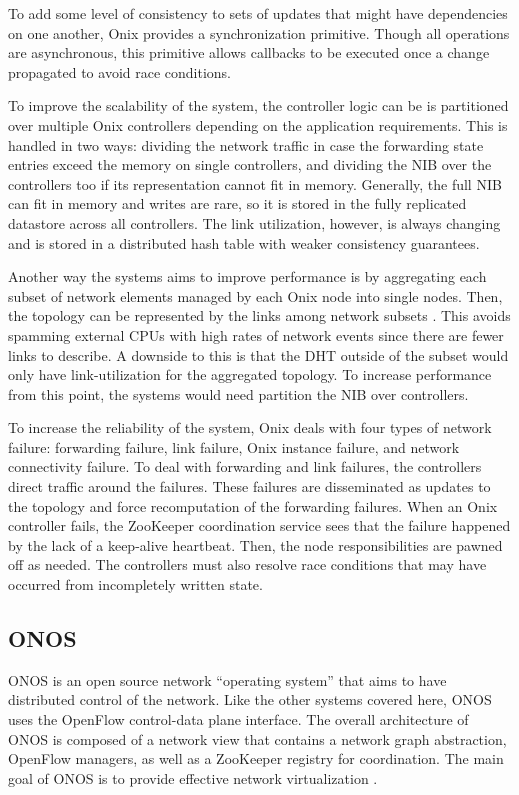 \documentclass[letterpaper,twocolumn,10pt]{article}
\begin{document}
To add some level of consistency to sets of updates that might have dependencies on one another, Onix provides a synchronization primitive. Though all operations are asynchronous, this primitive allows callbacks to be executed once a change propagated to avoid race conditions.

To improve the scalability of the system, the controller logic can be is partitioned over multiple Onix controllers depending on the application requirements. This is handled in two ways: dividing the network traffic in case the forwarding state entries exceed the memory on single controllers, and dividing the NIB over the controllers too if its representation cannot fit in memory. Generally, the full NIB can fit in memory and writes are rare, so it is stored in the fully replicated datastore across all controllers. The link utilization, however, is always changing and is stored in a distributed hash table with weaker consistency guarantees.

Another way the systems aims to improve performance is by aggregating each subset of network elements managed by each Onix node into single nodes. Then, the topology can be represented by the links among network subsets \cite{koponen2010onix}. This avoids spamming external CPUs with high rates of network events since there are fewer links to describe. A downside to this is that the DHT outside of the subset would only have link-utilization for the aggregated topology. To increase performance from this point, the systems would need partition the NIB over controllers.

To increase the reliability of the system, Onix deals with four types of network failure: forwarding failure, link failure, Onix instance failure, and network connectivity failure. To deal with forwarding and link failures, the controllers direct traffic around the failures. These failures are disseminated as updates to the topology and force recomputation of the forwarding failures. When an Onix controller fails, the ZooKeeper coordination service sees that the failure happened by the lack of a keep-alive heartbeat. Then, the node responsibilities are pawned off as needed. The controllers must also resolve race conditions that may have occurred from incompletely written state.
    
\subsection{ONOS}

ONOS is an open source network ``operating system'' that aims to have distributed control of the network. Like the other systems covered here, ONOS uses the OpenFlow control-data plane interface. The overall architecture of ONOS is composed of a network view that contains a network graph abstraction, OpenFlow managers, as well as a ZooKeeper registry for coordination. The main goal of ONOS is to provide effective network virtualization \cite{berde2014onos}.
\end{document}
